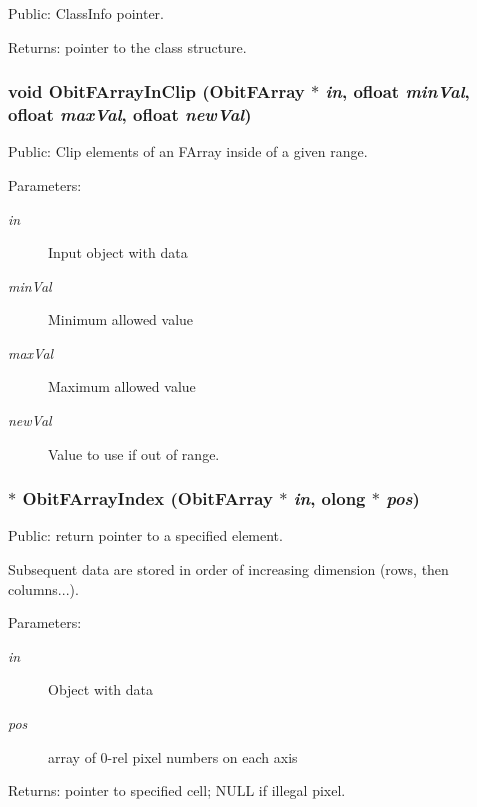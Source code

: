 Public: Class\-Info pointer. 

\begin{Desc}
\item[Returns:]pointer to the class structure. \end{Desc}
\subsubsection{\setlength{\rightskip}{0pt plus 5cm}void Obit\-FArray\-In\-Clip ({\bf Obit\-FArray} $\ast$ {\em in}, {\bf ofloat} {\em min\-Val}, {\bf ofloat} {\em max\-Val}, {\bf ofloat} {\em new\-Val})}\label{ObitFArray_8c_a46}


Public: Clip elements of an FArray inside of a given range. 

\begin{Desc}
\item[Parameters:]
\begin{description}
\item[{\em in}]Input object with data \item[{\em min\-Val}]Minimum allowed value \item[{\em max\-Val}]Maximum allowed value \item[{\em new\-Val}]Value to use if out of range. \end{description}
\end{Desc}
\subsubsection{$\ast$ Obit\-FArray\-Index ({\bf Obit\-FArray} $\ast$ {\em in}, {\bf olong} $\ast$ {\em pos})}\label{ObitFArray_8c_a23}


Public: return pointer to a specified element. 

Subsequent data are stored in order of increasing dimension (rows, then columns...). \begin{Desc}
\item[Parameters:]
\begin{description}
\item[{\em in}]Object with data \item[{\em pos}]array of 0-rel pixel numbers on each axis \end{description}
\end{Desc}
\begin{Desc}
\item[Returns:]pointer to specified cell; NULL if illegal pixel. \end{Desc}
